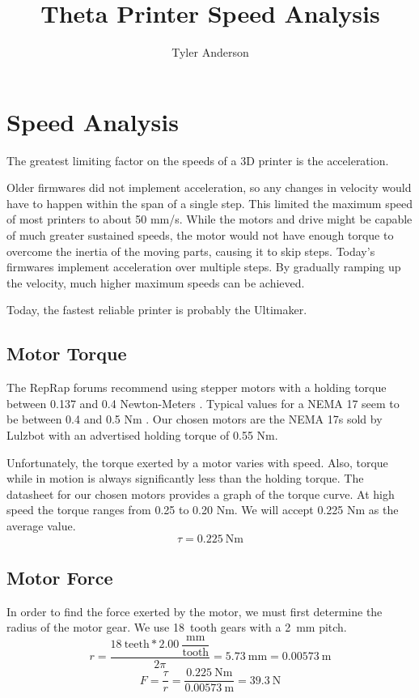 \documentclass[12pt,letterpaper]{report}
\author{Tyler Anderson}
\title{Theta Printer Speed Analysis}
\begin{document}
\maketitle

\section*{Speed Analysis}
The greatest limiting factor on the speeds of a 3D printer is the acceleration.

Older firmwares did not implement acceleration, so any changes in velocity would have to happen within the span of a single step. This limited the maximum speed of most printers to about 50 mm/s. While the motors and drive might be capable of much greater sustained speeds, the motor would not have enough torque to overcome the inertia of the moving parts, causing it to skip steps. Today's firmwares implement acceleration over multiple steps. By gradually ramping up the velocity, much higher maximum speeds can be achieved.

Today, the fastest reliable printer is probably the Ultimaker.

\subsection*{Motor Torque}
The RepRap forums recommend using stepper motors with a holding torque between 0.137 and 0.4 Newton-Meters \cite{rtorque}. Typical values for a NEMA 17 seem to be between 0.4 and 0.5 Nm \cite{htorque}. Our chosen motors are the NEMA 17s sold by Lulzbot with an advertised holding torque of 0.55 Nm.

Unfortunately, the torque exerted by a motor varies with speed. Also, torque while in motion is always significantly less than the holding torque. The datasheet for our chosen motors \cite{lulzmotor} provides a graph of the torque curve. At high speed the torque ranges from 0.25 to 0.20 Nm. We will accept 0.225 Nm as the average value.
\begin{equation}
	\tau = 0.225~\mathrm{Nm}
\end{equation}

\subsection*{Motor Force}
In order to find the force exerted by the motor, we must first determine the radius of the motor gear. We use 18~tooth gears with a 2~mm pitch.
\begin{equation}
	r = \dfrac{18~\mathrm{teeth}*2.00~\dfrac{\mathrm{mm}}{\mathrm{tooth}}}{2\pi} = 5.73~\mathrm{mm} = 0.00573~\mathrm{m}
\end{equation}
\begin{equation}
	F = \dfrac{\tau}{r} = \dfrac{0.225~\mathrm{Nm}}{0.00573~\mathrm{m}} = 39.3~\mathrm{N}
\end{equation}
\end{document}
